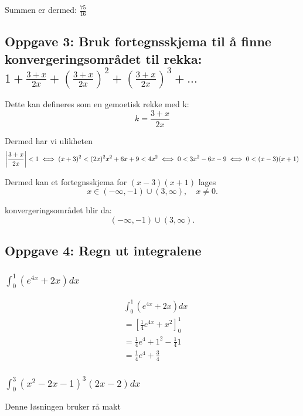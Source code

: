 \documentclass{article}
\begin{document}
Summen er dermed: $\frac{75}{16}$

\subsection{Oppgave 3: Bruk fortegnsskjema til å finne konvergeringsområdet til rekka: $1+\frac{3+x}{2x}+(\frac{3+x}{2x})^2+(\frac{3+x}{2x})^3+...$}


Dette kan defineres som en gemoetisk rekke med k:
\[
k = \frac{3+x}{2x}
\]

Dermed har vi ulikheten
\[
\left|\frac{3+x}{2x}\right| < 1 \;\Longleftrightarrow\; (x+3)^2 < (2x)^2 \\
x^2+6x+9 < 4x^2 \;\Longleftrightarrow\; 0 < 3x^2 - 6x - 9 \;\Longleftrightarrow\; 0 < (x-3)(x+1)
\]

Dermed kan et fortegnsskjema for $(x-3)(x+1)$ lages
\[
x \in (-\infty,-1)\cup(3,\infty), \quad x\neq 0.
\]

konvergeringsområdet blir da:
\[
(-\infty,-1)\cup(3,\infty).
\]

\subsection{Oppgave 4: Regn ut integralene}

\subsubsection{$\int_{0}^{1} (e^{4x}+2x) dx$}

\begin{align*}
    & \int_{0}^{1} (e^{4x}+2x) dx \\
    & = [\frac{1}{4} e^{4x} + x^2]^1_0 \\
    &= \frac{1}{4} e^4 + 1^2 - \frac{1}{4}1 \\
    &= \frac{1}{4} e^4 + \frac{3}{4}
\end{align*}

\subsubsection{$\int_{0}^{3} (x^2-2x-1)^3(2x-2) dx$}

Denne løsningen bruker rå makt
\end{document}
